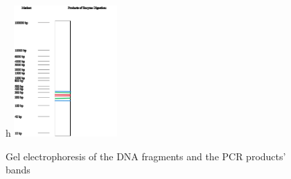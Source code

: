 \begin{figure}{h}
    \centering
    \includegraphics[width=0.35\textwidth]{Figures/Exc4sub6.png}
    \caption{Gel electrophoresis of the DNA fragments and the PCR products' bands}
    \label{fig:Exc4sub6}
\end{figure}






